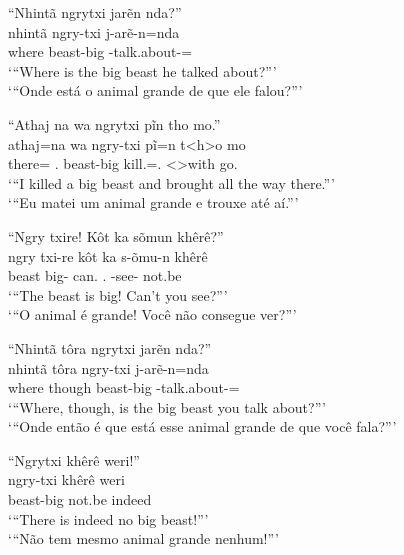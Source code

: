\documentclass[output=paper,
modfonts,nonflat
]{langsci/langscibook}
\begin{document}
\ea  ``Nhintã ngrytxi jarẽn nda?'' \\[.3em]
\gll nhintã ngry-txi  j-arẽ-n=nda                  \\
     where  beast-big \E-talk.about-\Nmlz{}=\Det{} \\
\glt `{}``Where is the big beast he talked about?''{}' \\
     `{}``Onde está o animal grande de que ele falou?''{}' \\
\z

\ea  ``Athaj na wa ngrytxi pĩn tho mo.'' \\[.3em]
\gll athaj=na       wa            ngry-txi  pĩ=n                t<h>o        mo       \\
     there=\N\Fut{} \First.\Nom{} beast-big kill.\Sg=\AAnd.\Ss{} <\Third>with go.\Pl{} \\
\glt `{}``I killed a big beast and brought all the way there.''{}' \\
     `{}``Eu matei um animal grande e trouxe até aí.''{}' \\
\label{exe:nasecposathaj}
\z

\ea  ``Ngry txire! Kôt ka sõmun khêrê?'' \\[.3em]
\gll ngry  txi-re     kôt        ka             s-õmu-n            khêrê  \\
     beast big-\Adj{} can.\Fut{} \Second.\Nom{} \Third-see-\Nmlz{} not.be \\
\glt `{}``The beast is big! Can't you see?''{}' \\
     `{}``O animal é grande! Você não consegue ver?''{}' \\
\label{exe:kotpripos}
\z

\newpage
\ea  ``Nhintã tôra ngrytxi jarẽn nda?'' \\[.3em]
\gll nhintã tôra   ngry-txi  j-arẽ-n=nda                  \\
     where  though beast-big \E-talk.about-\Nmlz{}=\Det{} \\
\glt `{}``Where, though, is the big beast you talk about?''{}' \\
     `{}``Onde então é que está esse animal grande de que você fala?''{}' \\
\z

\ea  ``Ngrytxi khêrê weri!'' \\[.3em]
\gll ngry-txi  khêrê  weri   \\
     beast-big not.be indeed \\
\glt `{}``There is indeed no big beast!''{}' \\
     `{}``Não tem mesmo animal grande nenhum!''{}' \\
\z
\end{document}
